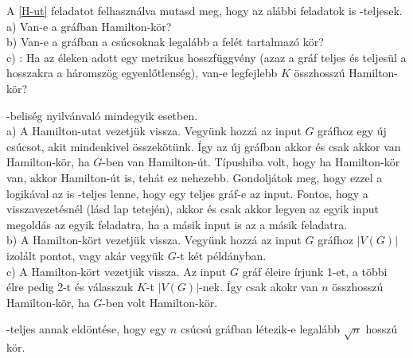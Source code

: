 \begin{Exercise}[counter={sorszam}, difficulty=0]
	A \ref{H-ut} feladatot felhaszn\'alva mutasd meg, hogy az al\'abbi feladatok is \NP-teljesek.\\
	a) Van-e a gr\'afban Hamilton-k\"or?\\
	b) Van-e a gr\'afban a cs\'ucsoknak legal\'abb a fel\'et tartalmaz\'o k\"or?\\
	c) : Ha az \'eleken adott egy metrikus hosszf\"uggv\'eny (azaz a gr\'af teljes \'es teljes\"ul a hosszakra a h\'aromsz\"og egyenl\H otlens\'eg), van-e legfejlebb $K$ \"osszhossz\'u Hamilton-k\"or?
\end{Exercise}	
\begin{Answer}
	\NP-belis\'eg nyilv\'anval\'o mindegyik esetben.\\
	a) A Hamilton-utat vezetj\"uk vissza. Vegy\"unk hozz\'a az input $G$ gr\'afhoz egy \'uj cs\'ucsot, akit mindenkivel \"osszek\"ot\"unk. \'Igy az \'uj gr\'afban akkor \'es csak akkor van Hamilton-k\"or, ha $G$-ben van Hamilton-\'ut.
	T\'ipushiba volt, hogy ha Hamilton-k\"or van, akkor Hamilton-\'ut is, teh\'at ez nehezebb. Gondolj\'atok meg, hogy ezzel a logik\'aval az is \NP-teljes lenne, hogy egy teljes gr\'af-e az input. Fontos, hogy a visszavezet\'esn\'el (l\'asd lap tetej\'en), akkor \'es csak akkor legyen az egyik input megold\'as az egyik feladatra, ha a m\'asik input is az a m\'asik feladatra.\\
	b) A Hamilton-k\"ort vezetj\"uk vissza. Vegy\"unk hozz\'a az input $G$ gr\'afhoz $|V(G)|$ izol\'alt pontot, vagy ak\'ar vegy\"uk $G$-t k\'et p\'eld\'anyban.\\
	c) A Hamilton-k\"ort vezetj\"uk vissza. Az input $G$ gr\'af \'eleire \'irjunk 1-et, a t\"obbi \'elre pedig 2-t \'es v\'alasszuk $K$-t $|V(G)|$-nek. \'Igy csak akokr van $n$ \"osszhossz\'u Hamilton-k\"or, ha $G$-ben volt Hamilton-k\"or. %
\end{Answer}

\begin{Exercise}[counter={sorszam}, difficulty=-1]
	 \NP-teljes annak eldöntése, hogy egy $n$ csúcsú gráfban létezik-e legalább $\sqrt n$ hosszú kör.
\end{Exercise}

